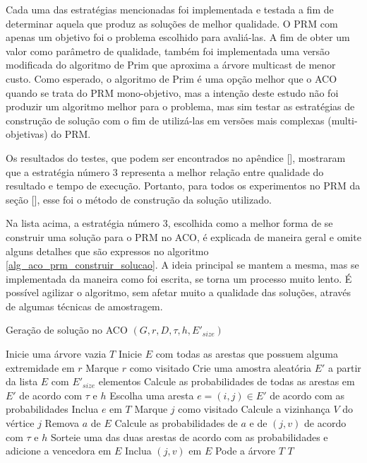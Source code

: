 Cada uma das estratégias mencionadas foi implementada e testada a fim de determinar aquela que produz as soluções de melhor qualidade. O PRM com apenas um objetivo foi o problema escolhido para avaliá-las. A fim de obter um valor como parâmetro de qualidade, também foi implementada uma versão modificada do algoritmo de Prim que aproxima a árvore multicast de menor custo. Como esperado, o algoritmo de Prim é uma opção melhor que o ACO quando se trata do PRM mono-objetivo, mas a intenção deste estudo não foi produzir um algoritmo melhor para o problema, mas sim testar as estratégias de construção de solução com o fim de utilizá-las em versões mais complexas (multi-objetivas) do PRM.

Os resultados do testes, que podem ser encontrados no apêndice [], mostraram que a estratégia número 3 representa a melhor relação entre qualidade do resultado e tempo de execução. Portanto, para todos os experimentos no PRM da seção [], esse foi o método de construção da solução utilizado.

Na lista acima, a estratégia número 3, escolhida como a melhor forma de se construir uma solução para o PRM no ACO, é explicada de maneira geral e omite alguns detalhes que são expressos no algoritmo \ref{alg_aco_prm_construir_solucao}. A ideia principal se mantem a mesma, mas se implementada da maneira como foi escrita, se torna um processo muito lento. É possível agilizar o algoritmo, sem afetar muito a qualidade das soluções, através de algumas técnicas de amostragem.

\begin{algorithm}
	\caption{Geração de solução no ACO $(G, r, D, \tau, h, E'_{size})$}
	\label{alg_aco_prm_construir_solucao}
	\begin{algorithmic}[1]
		\State Inicie uma árvore vazia $T$
		\State Inicie $E$ com todas as arestas que possuem alguma extremidade em $r$
		\State Marque $r$ como visitado
			\State Crie uma amostra aleatória $E'$ a partir da lista $E$ com $E'_{size}$ elementos
			\State Calcule as probabilidades de todas as arestas em $E'$ de acordo com $\tau$ e $h$
			\State Escolha uma aresta $e=(i,j) \in E'$ de acordo com as probabilidades
			\State Inclua $e$ em $T$
			\State Marque $j$ como visitado
			\State Calcule a vizinhança $V$ do vértice $j$
					\State Remova $a$ de $E$
					\State Calcule as probabilidades de $a$ e de $(j, v)$ de acordo com $\tau$ e $h$
					\State Sorteie uma das duas arestas de acordo com as probabilidades e adicione a vencedora em $E$
				\EndIf
					\State Inclua $(j, v)$ em $E$
				\EndIf
			\EndFor
		\EndWhile
		\State Pode a árvore $T$
		\State \Return $T$
	\end{algorithmic}
\end{algorithm}

